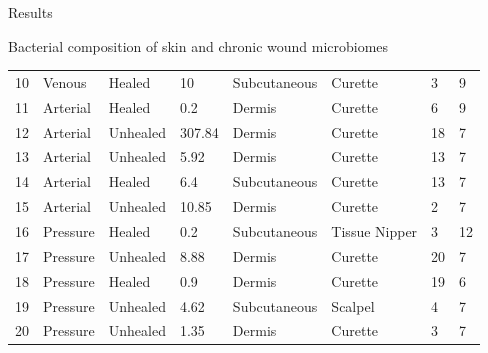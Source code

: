 \documentclass[oneside,12pt,final]{sty/ucthesis-CA2012}
\begin{document}
\begin{mainmatter}
\begin{section}{Results}
\begin{subsection}{Bacterial composition of skin and chronic wound microbiomes}
\begin{table}[h]
{\begin{tabular}{llllllll}
10         & Venous     & Healed          & 10                  & Subcutaneous         & Curette       & 3                         & 9                            \\
11         & Arterial   & Healed          & 0.2                 & Dermis               & Curette       & 6                         & 9                            \\
12         & Arterial   & Unhealed        & 307.84              & Dermis               & Curette       & 18                        & 7                            \\
13         & Arterial   & Unhealed        & 5.92                & Dermis               & Curette       & 13                        & 7                            \\
14         & Arterial   & Healed          & 6.4                 & Subcutaneous         & Curette       & 13                        & 7                            \\
15         & Arterial   & Unhealed        & 10.85               & Dermis               & Curette       & 2                         & 7                            \\
16         & Pressure   & Healed          & 0.2                 & Subcutaneous         & Tissue Nipper & 3                         & 12                           \\
17         & Pressure   & Unhealed        & 8.88                & Dermis               & Curette       & 20                        & 7                            \\
18         & Pressure   & Healed          & 0.9                 & Dermis               & Curette       & 19                        & 6                            \\
19         & Pressure   & Unhealed        & 4.62                & Subcutaneous         & Scalpel       & 4                         & 7                            \\
20         & Pressure   & Unhealed        & 1.35                & Dermis               & Curette       & 3                         & 7   \\
\hline                        
\end{tabular}}
\end{table}


\end{subsection}
\end{section}
\end{mainmatter}
\end{document}
